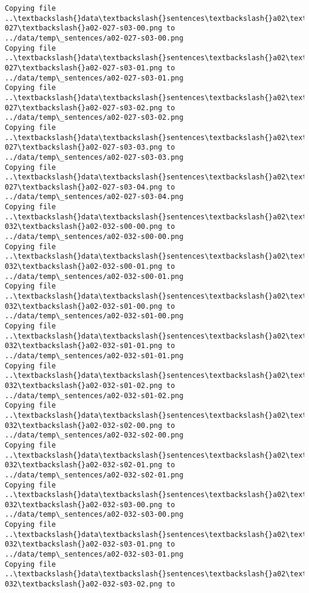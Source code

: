 \documentclass[11pt]{article}
\begin{document}
\begin{Verbatim}[commandchars=\\\{\}]
Copying file ..\textbackslash{}data\textbackslash{}sentences\textbackslash{}a02\textbackslash{}a02-027\textbackslash{}a02-027-s03-00.png to
../data/temp\_sentences/a02-027-s03-00.png
Copying file ..\textbackslash{}data\textbackslash{}sentences\textbackslash{}a02\textbackslash{}a02-027\textbackslash{}a02-027-s03-01.png to
../data/temp\_sentences/a02-027-s03-01.png
Copying file ..\textbackslash{}data\textbackslash{}sentences\textbackslash{}a02\textbackslash{}a02-027\textbackslash{}a02-027-s03-02.png to
../data/temp\_sentences/a02-027-s03-02.png
Copying file ..\textbackslash{}data\textbackslash{}sentences\textbackslash{}a02\textbackslash{}a02-027\textbackslash{}a02-027-s03-03.png to
../data/temp\_sentences/a02-027-s03-03.png
Copying file ..\textbackslash{}data\textbackslash{}sentences\textbackslash{}a02\textbackslash{}a02-027\textbackslash{}a02-027-s03-04.png to
../data/temp\_sentences/a02-027-s03-04.png
Copying file ..\textbackslash{}data\textbackslash{}sentences\textbackslash{}a02\textbackslash{}a02-032\textbackslash{}a02-032-s00-00.png to
../data/temp\_sentences/a02-032-s00-00.png
Copying file ..\textbackslash{}data\textbackslash{}sentences\textbackslash{}a02\textbackslash{}a02-032\textbackslash{}a02-032-s00-01.png to
../data/temp\_sentences/a02-032-s00-01.png
Copying file ..\textbackslash{}data\textbackslash{}sentences\textbackslash{}a02\textbackslash{}a02-032\textbackslash{}a02-032-s01-00.png to
../data/temp\_sentences/a02-032-s01-00.png
Copying file ..\textbackslash{}data\textbackslash{}sentences\textbackslash{}a02\textbackslash{}a02-032\textbackslash{}a02-032-s01-01.png to
../data/temp\_sentences/a02-032-s01-01.png
Copying file ..\textbackslash{}data\textbackslash{}sentences\textbackslash{}a02\textbackslash{}a02-032\textbackslash{}a02-032-s01-02.png to
../data/temp\_sentences/a02-032-s01-02.png
Copying file ..\textbackslash{}data\textbackslash{}sentences\textbackslash{}a02\textbackslash{}a02-032\textbackslash{}a02-032-s02-00.png to
../data/temp\_sentences/a02-032-s02-00.png
Copying file ..\textbackslash{}data\textbackslash{}sentences\textbackslash{}a02\textbackslash{}a02-032\textbackslash{}a02-032-s02-01.png to
../data/temp\_sentences/a02-032-s02-01.png
Copying file ..\textbackslash{}data\textbackslash{}sentences\textbackslash{}a02\textbackslash{}a02-032\textbackslash{}a02-032-s03-00.png to
../data/temp\_sentences/a02-032-s03-00.png
Copying file ..\textbackslash{}data\textbackslash{}sentences\textbackslash{}a02\textbackslash{}a02-032\textbackslash{}a02-032-s03-01.png to
../data/temp\_sentences/a02-032-s03-01.png
Copying file ..\textbackslash{}data\textbackslash{}sentences\textbackslash{}a02\textbackslash{}a02-032\textbackslash{}a02-032-s03-02.png to

\end{Verbatim}
\end{document}
